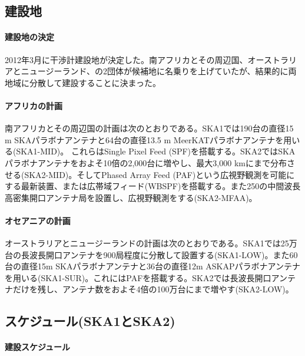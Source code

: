 \subsection{建設地}
\label{c01.s2.ss2}

\paragraph{建設地の決定} 

2012年3月に干渉計建設地が決定した。南アフリカとその周辺国、オーストラリアとニュージーランド、の2団体が候補地に名乗りを上げていたが、結果的に両地域に分散して建設することに決まった。

\paragraph{アフリカの計画} 

南アフリカとその周辺国の計画は次のとおりである。SKA1では190台の直径15 m SKAパラボナアンテナと64台の直径13.5 m MeerKATパラボナアンテナを用いる(SKA1-MID)。 これらはSingle Pixel Feed (SPF)を搭載する。SKA2ではSKAパラボナアンテナをおよそ10倍の2,000台に増やし、最大3,000 kmにまで分布させる(SKA2-MID)。そしてPhased Array Feed (PAF)という広視野観測を可能にする最新装置、または広帯域フィード(WBSPF)を搭載する。また250の中間波長高密集開口アンテナ局を設置し、広視野観測をする(SKA2-MFAA)。

\paragraph{オセアニアの計画} 

オーストラリアとニュージーランドの計画は次のとおりである。SKA1では25万台の長波長開口アンテナを900局程度に分散して設置する(SKA1-LOW)。また60台の直径15m SKAパラボナアンテナと36台の直径12m ASKAPパラボナアンテナを用いる(SKA1-SUR)。これにはPAFを搭載する。SKA2では長波長開口アンテナだけを残し、アンテナ数をおよそ4倍の100万台にまで増やす(SKA2-LOW)。

\subsection{スケジュール(SKA1とSKA2)}
\label{c01.s2.ss3}

\paragraph{建設スケジュール} 

